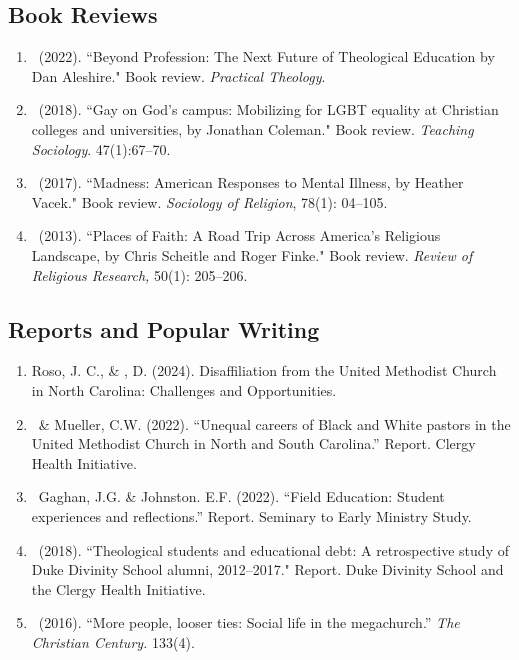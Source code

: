 \subsection*{Book Reviews}
\begin{enumerate} 
\item \Eagle\  (2022). ``Beyond Profession: The Next Future of Theological Education by Dan Aleshire." Book review.  \emph{Practical Theology}. 
	
\item \Eagle\  (2018). ``Gay on God’s campus: Mobilizing for LGBT equality at Christian colleges and universities, by Jonathan Coleman." Book review. \emph{Teaching Sociology}. 47(1):67--70. 

\item \Eagle\ (2017). ``Madness: American Responses to Mental Illness, by Heather Vacek." Book review. \emph{Sociology of Religion}, 78(1): 04--105. 

\item \Eagle\ (2013). ``Places of Faith: A Road Trip Across America's Religious Landscape, by Chris Scheitle and Roger Finke." Book review.  \emph{Review of Religious Research,} 50(1): 205--206. 
\end{enumerate}

\subsection*{Reports and Popular Writing}
\begin{enumerate} 
\item Roso, J. C., \& \Eagle, D. (2024). Disaffiliation from the United Methodist Church in North Carolina: Challenges and Opportunities. 

\item \Eagle\, \& Mueller, C.W. (2022). ``Unequal careers of Black and White pastors in the United Methodist Church in North and South Carolina.'' Report. Clergy Health Initiative.

\item \Eagle\, Gaghan, J.G. \& Johnston. E.F. (2022). ``Field Education: Student experiences and reflections.'' Report. Seminary to Early Ministry Study.

\item \Eagle\ (2018). ``Theological students and educational debt: A retrospective study of Duke Divinity School alumni, 2012--2017." Report. Duke Divinity School and the Clergy Health Initiative.

\item \Eagle\ (2016). ``More people, looser ties: Social life in the megachurch.'' \emph{The Christian Century.} 133(4).
\end{enumerate}